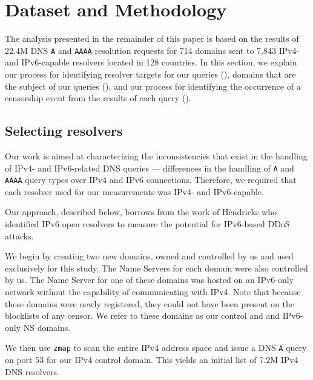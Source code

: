 \section{Dataset and Methodology}\label{sec:methodology}

The analysis presented in the remainder of this paper is based on the results of
22.4M DNS {\tt A} and {\tt AAAA} resolution requests for 714 domains sent to
7,843 IPv4- and IPv6-capable resolvers located in 128 countries.
%
In this section, we explain our process for identifying resolver targets for
our queries (), domains that are the subject of
our queries (), and our process for identifying
the occurrence of a censorship event from the results of each query
().

\subsection{Selecting resolvers} \label{sec:methodology:resolvers}
%
Our work is aimed at characterizing the inconsistencies that exist in the
handling of IPv4- and IPv6-related DNS queries --- \ie differences in the
handling of {\tt A} and {\tt AAAA} query types over IPv4 and IPv6
connections. Therefore, we required that each resolver used for our
measurements was IPv4- and IPv6-capable.
%

Our approach, described below, borrows from the work of Hendricks \etal
\cite{hendriks2017potential} who identified IPv6 open resolvers to measure the
potential for IPv6-based DDoS attacks.

We begin by creating two new domains, owned and controlled by us and used
exclusively for this study. The Name Servers for each domain were also
controlled by us. The Name Server for one of these domains was hosted on
an IPv6-only network without the capability of communicating with IPv4.
%
Note that because these domains were newly registered, they could not have been
present on the blocklists of any censor. We refer to these domains as our
{control and and IPv6-only NS domains}.
%

We then use {\tt zmap} \cite{Durumeric13zmap} to scan the entire IPv4 address
space and issue a DNS {\tt A} query on port 53 for our IPv4 control
domain. This yields an initial list of 7.2M IPv4 DNS resolvers.
%

